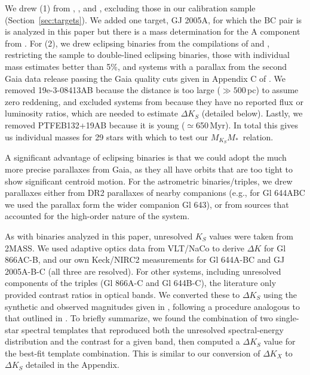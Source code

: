 \documentclass[twocolumn]{aastex62}
\newcommand{\mmk}{$M_{K_S}$\textendash$M_*$}
\begin{document}
We drew (1) from \citet{Hen1993}, \citet{Delfosse2000}, and \citet{Benedict2016}, excluding those in our calibration sample (Section~\ref{sec:targets}). We added one target, GJ 2005A, for which the BC pair is is analyzed in this paper but there is a mass determination for the A component from \citet{Sef2008}. For (2), we drew eclipsing binaries from the compilations of \citet{Hartman2011} and \citet{Parsons2018}, restricting the sample to double-lined eclipsing binaries, those with individual mass estimates better than 5\%, and systems with a parallax from the second Gaia data release passing the Gaia quality cuts given in Appendix C of \citet{GaiaDr2}. We removed 19e-3-08413AB because the distance is too large ($\gg500\,$pc) to assume zero reddening, and excluded systems from \citet{Kraus2011} because they have no reported flux or luminosity ratios, which are needed to estimate $\Delta K_S$ (detailed below). Lastly, we removed PTFEB132+19AB \citep{2017ApJ...845...72K} because it is young ($\simeq$650\,Myr). In total this gives us individual masses for 29 stars with which to test our \mmk\ relation. 

A significant advantage of eclipsing binaries is that we could adopt the much more precise parallaxes from Gaia, as they all have orbits that are too tight to show significant centroid motion. For the astrometric binaries/triples, we drew parallaxes either from DR2 parallaxes of nearby companions (e.g., for Gl 644ABC we used the parallax form the wider companion Gl 643), or from sources that accounted for the high-order nature of the system. 

As with binaries analyzed in this paper, unresolved $K_S$ values were taken from 2MASS. We used adaptive optics data from VLT/NaCo to derive $\Delta K$ for Gl 866AC-B, and our own Keck/NIRC2 measurements for Gl 644A-BC and GJ 2005A-B-C (all three are resolved). For other systems, including unresolved components of the triples (Gl 866A-C and Gl 644B-C), the literature only provided contrast ratios in optical bands. We converted these to $\Delta K_S$ using the synthetic and observed magnitudes given in \citet{Mann2015b}, following a procedure analogous to that outlined in \citep{2017ApJ...845...72K}. To briefly summarize, we found the combination of two single-star spectral templates that reproduced both the unresolved spectral-energy distribution and the contrast for a given band, then computed a $\Delta K_S$ value for the best-fit template combination. This is similar to our conversion of $\Delta K_X$ to $\Delta K_S$ detailed in the Appendix. 
\end{document}
